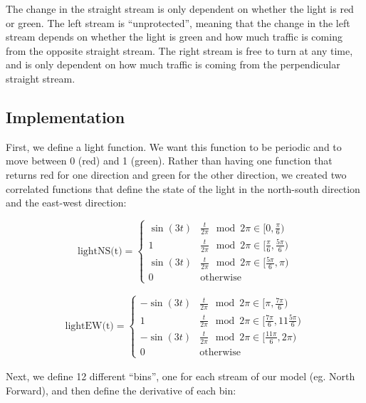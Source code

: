 \documentclass[12pt]{article}
\begin{document}
    The change in the straight stream is only dependent on whether the light is red or green. The left stream is “unprotected”, meaning that the change in the left stream depends on whether the light is green and how much traffic is coming from the opposite straight stream. The right stream is free to turn at any time, and is only dependent on how much traffic is coming from the perpendicular straight stream.
    
    \subsection{Implementation}
    
    First, we define a light function. We want this function to be periodic and to move between 0 (red) and 1 (green). Rather than having one function that returns red for one direction and green for the other direction, we created two correlated functions that define the state of the light in the north-south direction and the east-west direction:
    
    \[
    \textrm{lightNS(t)} =
    \begin{cases} 
        \sin(3t) & \frac{t}{ 2\pi} \mod 2 \pi\in [0, \frac{\pi}{6}) \\
        1 & \frac{t}{ 2\pi} \mod 2 \pi\in [\frac{\pi}{6},\frac{5\pi}{6}) \\
        \sin(3t) & \frac{t}{ 2\pi} \mod 2 \pi\in [\frac{5\pi}{6}, \pi) \\
        0 & \text{otherwise}
    \end{cases}
    \]
    
    
    
    
    \begin{align*}
        \textrm{lightEW(t)} =
        \begin{cases} 
            -\sin(3t) & \frac{t}{2\pi} \mod 2 \pi \in [\pi,\frac{7\pi}{6} ) \\ 
            1 & \frac{t}{ 2\pi }\mod 2 \pi \in [\frac{7\pi}{6},11\frac{5\pi}{6} ) \\
            -\sin(3t) & \frac{t}{ 2\pi} \mod 2 \pi\in  [\frac{11\pi}{6}, 2 \pi) \\
            0 & \text{otherwise}
        \end{cases}
    \end{align*}
    
    Next, we define 12 different “bins”, one for each stream of our model (eg. North Forward), and then define the derivative of each bin:\\\\
    
\end{document}
